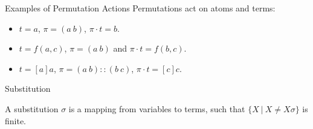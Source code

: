 
\begin{frame}{Examples of Permutation Actions}
    Permutations act on atoms and terms:
    \begin{itemize}
        \item $t = a$, $\pi = (a \ b)$, $\pi \cdot t = b$.
        \item $t = f(a, c)$, $\pi = (a \ b)$ and $\pi \cdot t = f(b, c)$.
        \item $t = [a]a$, $\pi = (a \ b)::(b \ c)$, $\pi \cdot t = [c]c$.
    \end{itemize}
\end{frame}

\begin{frame}{Substitution}
    \begin{definition}[Substitution]
    A substitution $\sigma$ is a mapping from variables to terms, such that
    $\{X \ | \ X \neq X\sigma \}$ is finite.
    \end{definition}
\end{frame}

%    

